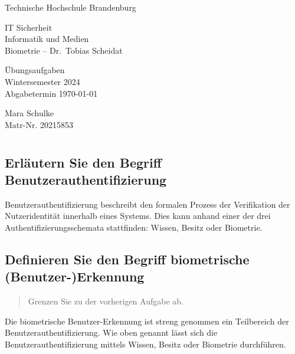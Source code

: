 \documentclass{article}
\newcommand{\annotation}[1]{
    \begin{quote}
    	\begin{textit}{#1}\end{textit}
    \end{quote}
}
\begin{document}
\begin{titlepage}
	\begin{center}
		\begin{Large}
			Technische Hochschule Brandenburg \\[1em]
		\end{Large}
		
		IT Sicherheit \\
		Informatik und Medien \\
		Biometrie – Dr.\ Tobias Scheidat
	\end{center}
	
	\vfill

	\begin{center}
		\Large{Übungsaufgaben}\\[0.5em]
		\large{Wintersemester 2024}\\[0.25em]
		\large{Abgabetermin \today}
	\end{center}

	\vfill

	\begin{center}
		Mara Schulke \\ Matr-Nr. 20215853
	\end{center}
\end{titlepage}


\tableofcontents

\listoffigures

\newpage

\section{}

\subsection{Erl\"autern Sie den Begriff Benutzerauthentifizierung}

Benutzerauthentifizierung beschreibt den formalen Prozess der Verifikation der Nutzeridentität innerhalb 
eines Systems. Dies kann anhand einer der drei Authentifizierungsschemata stattfinden: Wissen, Besitz oder 
Biometrie.

\subsection{Definieren Sie den Begriff biometrische (Benutzer-)Erkennung}
\annotation{Grenzen Sie zu der vorherigen Aufgabe ab.}
Die biometrische Benutzer-Erkennung ist streng genommen ein Teilbereich der Benutzerauthentifizierung. Wie 
oben genannt lässt sich die Benutzerauthentifizierung mittels Wissen, Besitz oder Biometrie durchführen.
\end{document}
